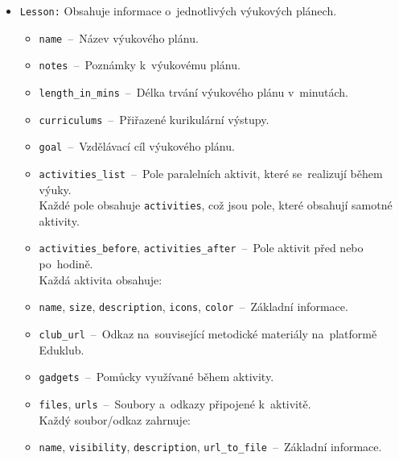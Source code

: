 \documentclass[male,czech,api_bc]{kitheses}
\begin{document}
\begin{itemize}
	\item \texttt{Lesson:} Obsahuje informace o~jednotlivých výukových plánech.
	\begin{itemize}
		\item \texttt{name}~--~Název výukového plánu.
		\item \texttt{notes}~--~Poznámky k~výukovému plánu.
		\item \texttt{length\_in\_mins}~--~Délka trvání výukového plánu v~minutách.
		\item \texttt{curriculums}~--~Přiřazené kurikulární výstupy.
		\item \texttt{goal}~--~Vzdělávací cíl výukového plánu.
		\item \texttt{activities\_list}~--~Pole paralelních aktivit, které se~realizují během výuky.
		\\Každé pole obsahuje \texttt{activities}, což jsou pole, které obsahují samotné aktivity.
		\item \texttt{activities\_before}, \texttt{activities\_after}~--~Pole aktivit před nebo po~hodině.
		\\Každá aktivita obsahuje:
		\item \texttt{name}, \texttt{size}, \texttt{description}, \texttt{icons}, \texttt{color}~--~Základní informace.
		\item \texttt{club\_url}~--~Odkaz na~související metodické materiály na~platformě Eduklub.
		\item \texttt{gadgets}~--~Pomůcky využívané během aktivity.
		\item \texttt{files}, \texttt{urls}~--~Soubory a~odkazy připojené k~aktivitě.
		\\Každý soubor/odkaz zahrnuje:
		\item \texttt{name}, \texttt{visibility}, \texttt{description}, \texttt{url\_to\_file}~--~Základní informace.
	\end{itemize}
\end{itemize}

\newpage %
\end{document}

